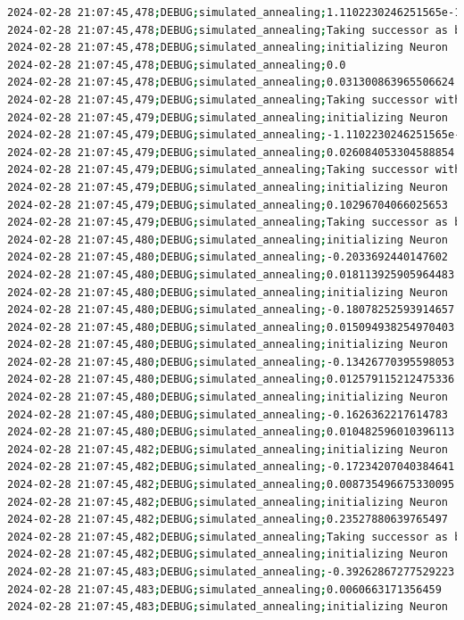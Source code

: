 \documentclass{article}
\begin{document}
\begin{lstlisting}[language=bash, caption=Example Output of Program]
2024-02-28 21:07:45,478;DEBUG;simulated_annealing;1.1102230246251565e-16
2024-02-28 21:07:45,478;DEBUG;simulated_annealing;Taking successor as better option (exploitation)
2024-02-28 21:07:45,478;DEBUG;simulated_annealing;initializing Neuron
2024-02-28 21:07:45,478;DEBUG;simulated_annealing;0.0
2024-02-28 21:07:45,478;DEBUG;simulated_annealing;0.031300863965506624
2024-02-28 21:07:45,479;DEBUG;simulated_annealing;Taking successor with probability 100% (exploration)
2024-02-28 21:07:45,479;DEBUG;simulated_annealing;initializing Neuron
2024-02-28 21:07:45,479;DEBUG;simulated_annealing;-1.1102230246251565e-16
2024-02-28 21:07:45,479;DEBUG;simulated_annealing;0.026084053304588854
2024-02-28 21:07:45,479;DEBUG;simulated_annealing;Taking successor with probability 99% (exploration)
2024-02-28 21:07:45,479;DEBUG;simulated_annealing;initializing Neuron
2024-02-28 21:07:45,479;DEBUG;simulated_annealing;0.10296704066025653
2024-02-28 21:07:45,479;DEBUG;simulated_annealing;Taking successor as better option (exploitation)
2024-02-28 21:07:45,480;DEBUG;simulated_annealing;initializing Neuron
2024-02-28 21:07:45,480;DEBUG;simulated_annealing;-0.2033692440147602
2024-02-28 21:07:45,480;DEBUG;simulated_annealing;0.018113925905964483
2024-02-28 21:07:45,480;DEBUG;simulated_annealing;initializing Neuron
2024-02-28 21:07:45,480;DEBUG;simulated_annealing;-0.18078252593914657
2024-02-28 21:07:45,480;DEBUG;simulated_annealing;0.015094938254970403
2024-02-28 21:07:45,480;DEBUG;simulated_annealing;initializing Neuron
2024-02-28 21:07:45,480;DEBUG;simulated_annealing;-0.13426770395598053
2024-02-28 21:07:45,480;DEBUG;simulated_annealing;0.012579115212475336
2024-02-28 21:07:45,480;DEBUG;simulated_annealing;initializing Neuron
2024-02-28 21:07:45,480;DEBUG;simulated_annealing;-0.1626362217614783
2024-02-28 21:07:45,480;DEBUG;simulated_annealing;0.010482596010396113
2024-02-28 21:07:45,482;DEBUG;simulated_annealing;initializing Neuron
2024-02-28 21:07:45,482;DEBUG;simulated_annealing;-0.17234207040384641
2024-02-28 21:07:45,482;DEBUG;simulated_annealing;0.008735496675330095
2024-02-28 21:07:45,482;DEBUG;simulated_annealing;initializing Neuron
2024-02-28 21:07:45,482;DEBUG;simulated_annealing;0.23527880639765497
2024-02-28 21:07:45,482;DEBUG;simulated_annealing;Taking successor as better option (exploitation)
2024-02-28 21:07:45,482;DEBUG;simulated_annealing;initializing Neuron
2024-02-28 21:07:45,483;DEBUG;simulated_annealing;-0.39262867277529223
2024-02-28 21:07:45,483;DEBUG;simulated_annealing;0.0060663171356459
2024-02-28 21:07:45,483;DEBUG;simulated_annealing;initializing Neuron

\end{lstlisting}
\end{document}
